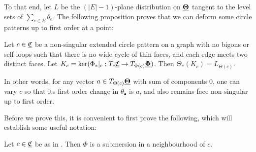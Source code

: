 To that end, let $L$ be the $(|E|-1)$-plane distribution on ${\underline{\mathbf{\Theta}}}$
tangent to the level sets of $\sum_{e\in E} \theta_e$.
The following proposition proves that we can deform
some circle patterns up to first order at a point:


\begin{prop}
\label{p:point_lift}
Let $c \in {\underline{\mathfrak{C}}}$ be a
non-singular extended circle pattern on a graph
with no bigons or self-loops such that
there is no wide cycle of thin faces,
and each edge meets two distinct faces.
Let $K_c = \ker (\Phi_*|_c : T_c {\underline{\mathfrak{C}}} \to T_{\Phi(c)} {\underline{\mathbf{\Phi}}})$.
Then $\Theta_*(K_c) = L_{\Theta(c)}$.

In other words, for any vector $a \in T_{\Theta(c)} {\underline{\mathbf{\Theta}}}$
with sum of components 0, one can vary $c$ so that its
first order change in $\theta_\bullet$ is $a$,
and also remains face non-singular up to first order.
\end{prop}


Before we prove this, it is convenient to first prove the following,
which will establish some useful notation:

\begin{lemma}
\label{l:Phi_full}
Let $c \in {\underline{\mathfrak{C}}}$ be as in .
Then $\Phi$ is a submersion in a neighbourhood of $c$.
\end{lemma}

